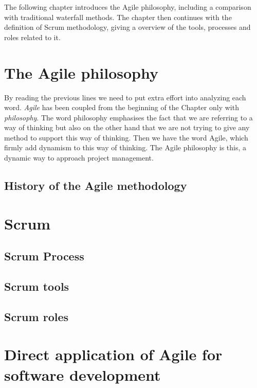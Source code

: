 \documentclass[../main.tex]{subfiles}
\begin{document}
The following chapter introduces the Agile philosophy, including a comparison with traditional waterfall methods. The chapter then continues with the definition of Scrum methodology, giving a overview of the tools, processes and roles related to it. 
\section{The Agile philosophy}
By reading the previous lines we need to put extra effort into analyzing each word. 
\textit{Agile} has been coupled from the beginning of the Chapter only with \textit{philosophy}.  
The word philosophy emphasises the fact that we are referring to a way of thinking but also on the other hand that we are not trying to give any method to support this way of thinking. Then we have the word Agile, which firmly add dynamism to this way of thinking. 
The Agile philosophy is this, a dynamic way to approach project management. 
\subsection{History of the Agile methodology}



\section{Scrum}
\subsection{Scrum Process}
\subsection{Scrum tools}
\subsection{Scrum roles}
\section{Direct application of Agile for software development}
\cleardoublepage
\end{document}
